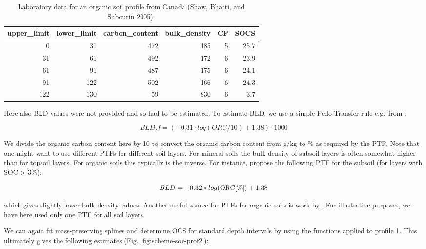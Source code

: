 \documentclass[graybox,natbib,nospthms,UStrade]{svmono}
\begin{document}
\begin{table}[t]

\caption{\label{tab:profile-can}Laboratory data for an organic soil profile from Canada  (Shaw, Bhatti, and Sabourin 2005).}
\centering
\begin{tabular}{rrrrrr}
\toprule
upper\_limit & lower\_limit & carbon\_content & bulk\_density & CF & SOCS\\
\midrule
0 & 31 & 472 & 185 & 5 & 25.7\\
31 & 61 & 492 & 172 & 6 & 23.9\\
61 & 91 & 487 & 175 & 6 & 24.1\\
91 & 122 & 502 & 166 & 6 & 24.3\\
122 & 130 & 59 & 830 & 6 & 3.7\\
\bottomrule
\end{tabular}
\end{table}

Here also BLD values were not provided and so had to be estimated. To estimate BLD, we use a simple Pedo-Transfer rule e.g.~from \citet{kochy2015global}:

\begin{equation}
BLD.f = (-0.31 \cdot log(ORC/10) + 1.38) \cdot 1000
\label{eq:kochy}
\end{equation}

We divide the organic carbon content here by 10 to convert the organic carbon content from g/kg to \% as required by the PTF. Note that one might want to use different PTFs for different soil layers. For mineral soils the bulk density of subsoil layers is often somewhat higher than for topsoil layers. For organic soils this typically is the inverse. For instance, \citet{kochy2015global} propose the following PTF for the subsoil (for layers with SOC \textgreater{} 3\%):

\begin{equation}
BLD = -0.32 * log({\rm ORC}[\%]) + 1.38
\label{eq:kochy}
\end{equation}

which gives slightly lower bulk density values. Another useful source for PTFs for organic soils is work by \citet{hossain2015bulk}. For illustrative purposes, we have here used only one PTF for all soil layers.

We can again fit mass-preserving splines and determine OCS for standard depth intervals by using the functions applied to profile 1. This ultimately gives the following estimates (Fig. \ref{fig:scheme-soc-prof2}):
\end{document}
